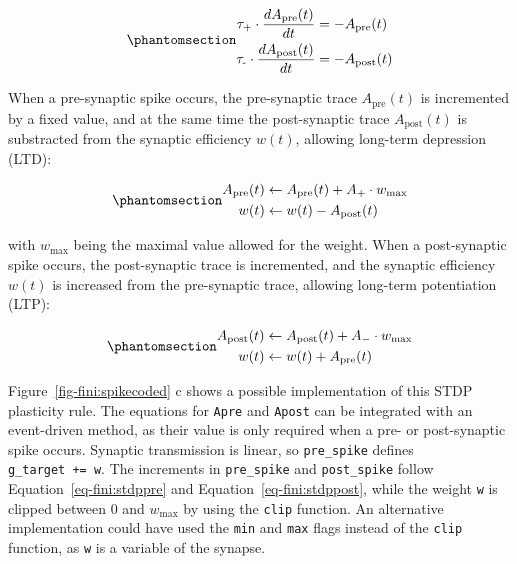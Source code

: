 \documentclass[
  11pt,
  a4paper,
]{scrbook}
\begin{document}
\begin{equation}\phantomsection\label{eq-fini:stdp}{
\begin{aligned}
\tau_\text{+} \cdot \frac{dA_\text{pre}(t)}{dt} &= - A_\text{pre}(t) \\
\tau_\text{-} \cdot \frac{dA_\text{post}(t)}{dt} &= - A_\text{post}(t) \\
\end{aligned}
}\end{equation}

When a pre-synaptic spike occurs, the pre-synaptic trace
\(A_\text{pre}(t)\) is incremented by a fixed value, and at the same
time the post-synaptic trace \(A_\text{post}(t)\) is substracted from
the synaptic efficiency \(w(t)\), allowing long-term depression (LTD):

\begin{equation}\phantomsection\label{eq-fini:stdppre}{
\begin{aligned}
A_\text{pre}(t) &\leftarrow A_\text{pre}(t) + A_+ \cdot w_\text{max}\\
w(t) &\leftarrow w(t) - A_\text{post}(t) \\
\end{aligned}
}\end{equation}

with \(w_\text{max}\) being the maximal value allowed for the weight.
When a post-synaptic spike occurs, the post-synaptic trace is
incremented, and the synaptic efficiency \(w(t)\) is increased from the
pre-synaptic trace, allowing long-term potentiation (LTP):

\begin{equation}\phantomsection\label{eq-fini:stdppost}{
\begin{aligned}
A_\text{post}(t) &\leftarrow A_\text{post}(t) + A_- \cdot w_\text{max}\\
w(t) &\leftarrow w(t) + A_\text{pre}(t) \\
\end{aligned}
}\end{equation}

Figure~\ref{fig-fini:spikecoded} c shows a possible implementation of
this STDP plasticity rule. The equations for \texttt{Apre} and
\texttt{Apost} can be integrated with an event-driven method, as their
value is only required when a pre- or post-synaptic spike occurs.
Synaptic transmission is linear, so \texttt{pre\_spike} defines
\texttt{g\_target\ +=\ w}. The increments in \texttt{pre\_spike} and
\texttt{post\_spike} follow Equation~\ref{eq-fini:stdppre} and
Equation~\ref{eq-fini:stdppost}, while the weight \texttt{w} is clipped
between 0 and \(w_\text{max}\) by using the \texttt{clip} function. An
alternative implementation could have used the \texttt{min} and
\texttt{max} flags instead of the \texttt{clip} function, as \texttt{w}
is a variable of the synapse.
\end{document}
